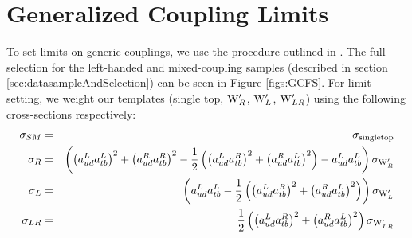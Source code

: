 \section{Generalized Coupling Limits}
\label{sec:GCTheta}
To set limits on generic couplings, we use the procedure outlined in \cite{CMS-PAS-B2G-12-010}.  
The full selection for the left-handed and mixed-coupling samples (described in section \ref{sec:datasampleAndSelection}) can be seen in Figure \ref{figs:GCFS}.
For limit setting, we weight our templates (single top, $\mathrm{W}^\prime_R$, $\mathrm{W}^\prime_L$, $\mathrm{W}^\prime_{LR}$) using the following cross-sections respectively:
\begin{eqnarray}\label{eq:xsec}
{\sigma}_{SM} &=& {\sigma}_{\text{singletop}}\\\nonumber
{\sigma}_{R} &=& \left(\left(a^L_{ud} a^L_{tb}\right)^2 + \left(a^R_{ud} a^R_{tb}\right)^2 - \frac{1}{2}\left(\left(a^L_{ud} a^R_{tb}\right)^2 + \left(a^R_{ud} a^L_{tb}\right)^2\right) - a^L_{ud} a^L_{tb}\right){\sigma}_{\mathrm{W}^\prime_R}\\\nonumber
{\sigma}_{L} &=& \left(a^L_{ud} a^L_{tb}-\frac{1}{2}\left(\left(a^L_{ud} a^R_{tb}\right)^2 +\left(a^R_{ud} a^L_{tb}\right)^2\right)\right){\sigma}_{\mathrm{W}^\prime_L}\\\nonumber
{\sigma}_{LR} &=& \frac{1}{2}\left(\left(a^L_{ud} a^R_{tb}\right)^2 +\left(a^R_{ud} a^L_{tb}\right)^2\right){\sigma}_{\mathrm{W}^\prime_{LR}}\\\nonumber
\end{eqnarray}



